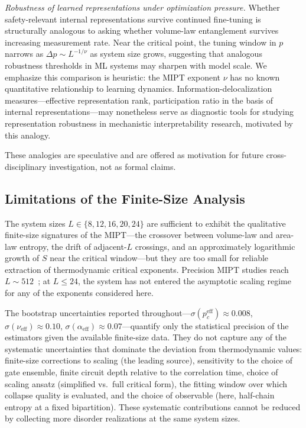\documentclass[twocolumn,prl,aps,floatfix]{revtex4-2}
\begin{document}
\textit{Robustness of learned representations under optimization pressure.}
Whether safety-relevant internal representations survive continued fine-tuning is
structurally analogous to asking whether volume-law entanglement survives increasing
measurement rate.
Near the critical point, the tuning window in $p$ narrows as $\Delta p \sim L^{-1/\nu}$
as system size grows, suggesting that analogous robustness thresholds in ML systems
may sharpen with model scale.
We emphasize this comparison is heuristic: the MIPT exponent $\nu$ has no known
quantitative relationship to learning dynamics.
Information-delocalization measures---effective representation rank,
participation ratio in the basis of internal representations---may nonetheless
serve as diagnostic tools for studying representation robustness in mechanistic
interpretability research, motivated by this analogy.

These analogies are speculative and are offered as motivation for future
cross-disciplinary investigation, not as formal claims.

\subsection{Limitations of the Finite-Size Analysis}
\label{sec:limitations}

The system sizes $L \in \{8, 12, 16, 20, 24\}$ are sufficient to exhibit the
qualitative finite-size signatures of the MIPT---the crossover between
volume-law and area-law entropy, the drift of adjacent-$L$ crossings, and
an approximately logarithmic growth of $S$ near the critical window---but
they are too small for reliable extraction of thermodynamic critical exponents.
Precision MIPT studies reach $L \sim 512$~\cite{Zabalo2020}; at $L \leq 24$,
the system has not entered the asymptotic scaling regime for any of the
exponents considered here.

The bootstrap uncertainties reported throughout---$\sigma(p_c^{\mathrm{eff}})
\approx 0.008$, $\sigma(\nu_{\mathrm{eff}}) \approx 0.10$,
$\sigma(\alpha_{\mathrm{eff}}) \approx 0.07$---quantify only the statistical
precision of the estimators given the available finite-size data.
They do not capture any of the systematic uncertainties that dominate the
deviation from thermodynamic values: finite-size corrections to scaling
(the leading source), sensitivity to the choice of gate ensemble, finite circuit
depth relative to the correlation time, choice of scaling ansatz (simplified
vs.\ full critical form), the fitting window over which collapse quality is
evaluated, and the choice of observable (here, half-chain entropy at a fixed
bipartition).
These systematic contributions cannot be reduced by collecting more disorder
realizations at the same system sizes.
\end{document}
